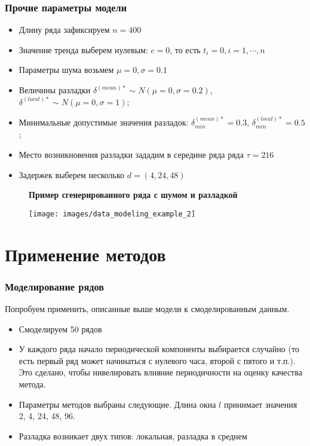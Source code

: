 \documentclass[intlimits, 9pt, unicode]{beamer}
\begin{document}
\begin{frame}
\frametitle{Прочие параметры модели}

\begin{itemize}
	\item Длину ряда зафиксируем $n = 400$
	\item Значение тренда выберем нулевым: $c = 0$, то есть $t_i = 0, i = 1,\cdots, n$
	\item Параметры шума возьмем $\mu = 0, \sigma = 0.1$
\end{itemize}


\begin{itemize}
	\item Величины разладки $\delta^{(mean)*} \sim N(\mu = 0,\sigma = 0.2)$, $\delta^{(local)*} \sim N(\mu = 0,\sigma = 1)$;
	\item Минимальные допустимые значения разладок: $\delta^{(mean)*}_{min} = 0.3$, $\delta^{(local)*}_{min} = 0.5$;
	\item Место возникновения разладки зададим в середине ряда ряда $\tau = 216$
	\item Задержек выберем несколько $ d = (4, 24, 48)$
\end{itemize}

\begin{figure}
\textbf{Пример сгенерированного ряда с шумом и разладкой}\par\medskip
\texttt{[image: images/data\_modeling\_example\_2]}
\end{figure}
\end{frame}


\section{Применение методов}

\begin{frame}
\frametitle{Моделирование рядов}

Попробуем применить, описанные выше модели к смоделированным данным.
\begin{itemize}
	\item Смоделируем 50 рядов
	\item У каждого ряда начало периодической компоненты выбирается случайно (то есть первый ряд может начинаться с нулевого часа, второй с пятого и т.п.). Это сделано, чтобы нивелировать влияние периодичности на оценку качества метода.
	\item Параметры методов выбраны следующие. Длина окна $l$ принимает значения 2, 4, 24, 48, 96. 
	\item Разладка возникает двух типов: локальная, разладка в среднем
\end{itemize}

\end{frame}
\end{document}
